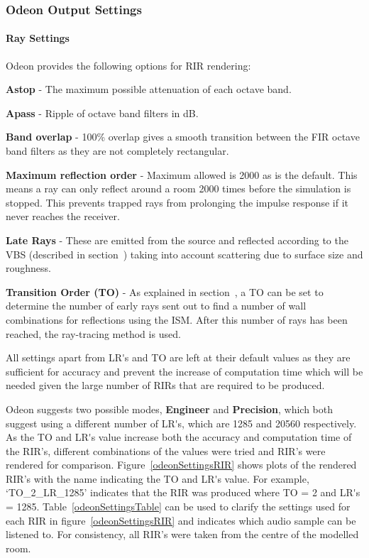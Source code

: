\documentclass[../../main.tex]{subfiles}
\begin{document}
		\subsubsection{Odeon Output Settings}
			\paragraph{Ray Settings}

				Odeon provides the following options for \ac{RIR} rendering:

				\textbf{Astop} - The maximum possible attenuation of each octave band.

				\textbf{Apass} - Ripple of octave band filters in dB.

				\textbf{Band overlap} - 100\% overlap gives a smooth transition between the FIR octave band filters as they are not completely rectangular.

				\textbf{Maximum reflection order} - Maximum allowed is 2000 as is the default. This means a ray can only reflect around a room 2000 times before the simulation is stopped. This prevents trapped rays from prolonging the impulse response if it never reaches the receiver.

				\textbf{Late Rays} - These are emitted from the source and reflected according to the \ac{VBS} (described in section~) taking into account scattering due to surface size and roughness.

				\textbf{Transition Order (TO)} - As explained in section~, a \ac{TO} can be set to determine the number of early rays sent out to find a number of wall combinations for reflections using the \ac{ISM}. After this number of rays has been reached, the ray-tracing method is used.

				All settings apart from \ac{LR's} and \ac{TO} are left at their default values as they are sufficient for accuracy and prevent the increase of computation time which will be needed given the large number of RIRs that are required to be produced.

				Odeon suggests two possible modes, \textbf{Engineer} and \textbf{Precision}, which both suggest using a different number of \ac{LR's}, which are 1285 and 20560 respectively. As the \ac{TO} and \ac{LR's} value increase both the accuracy and computation time of the \ac{RIR}'s, different combinations of the values were tried and \ac{RIR}'s were rendered for comparison. Figure~\ref{odeonSettingsRIR} shows plots of the rendered \ac{RIR}'s with the name indicating the \ac{TO} and \ac{LR's} value. For example, `TO\_2\_LR\_1285' indicates that the \ac{RIR} was produced where \ac{TO} = 2 and \ac{LR's} = 1285. Table~\ref{odeonSettingsTable} can be used to clarify the settings used for each \ac{RIR} in figure~\ref{odeonSettingsRIR} and indicates which audio sample can be listened to. For consistency, all \ac{RIR}'s were taken from the centre of the modelled room.
\end{document}
